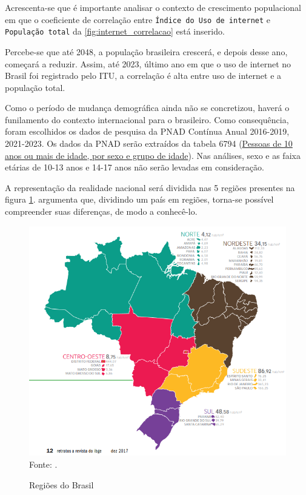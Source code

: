 Acrescenta-se que é importante analisar o contexto de crescimento populacional em que o coeficiente de correlação entre \texttt{Índice do Uso de internet} e \texttt{População total} da \ref{fig:internet_correlacao} está inserido. 

Percebe-se que até 2048, a população brasileira crescerá, e depois desse ano, começará a reduzir. Assim, até 2023, último ano em que o uso de internet no Brasil foi registrado pelo ITU, a correlação é alta entre uso de internet e a população total.

Como o período de mudança demográfica ainda não se concretizou, haverá o funilamento do contexto internacional para o brasileiro. Como consequência, foram escolhidos os dados de pesquisa da PNAD Contínua Anual 2016-2019, 2021-2023. Os dados da PNAD serão extraídos da tabela 6794 (\href{Htps://sidra.ibge.gov.br/tabela/6794}{Pessoas de 10 anos ou mais de idade, por sexo e grupo de idade}). Nas análises, sexo e as faixa etárias de 10-13 anos e 14-17 anos não serão levadas em consideração.

A representação da realidade nacional será dividida nas 5 regiões presentes na figura \ref{fig:regioes_brasil}. \cite{HAMAM_2017} argumenta que, dividindo um país em regiões, torna-se possível compreender suas diferenças, de modo a conhecê-lo.

\begin{figure}[H]
    \centering
    \caption{Regiões do Brasil}
    \includegraphics[width=1\linewidth]{figuras/regioes/regioes_brasil.PNG}
    \label{fig:regioes_brasil}
    \footnotesize{Fonte: \cite{HAMAM_2017}.}
\end{figure}

